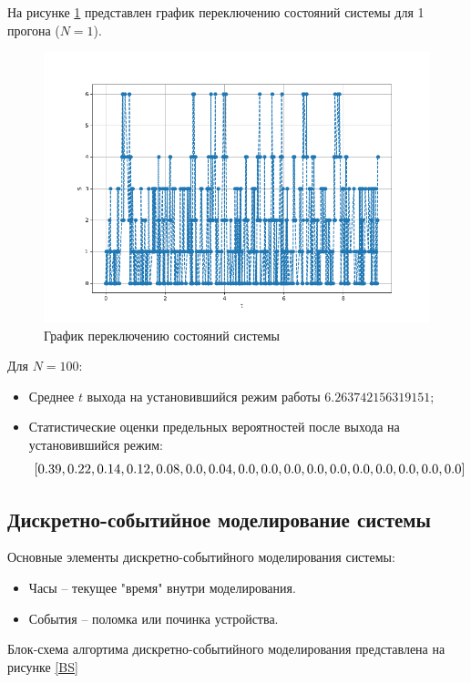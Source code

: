 На рисунке \ref{MDP} представлен график переключению состояний системы для 1 прогона ($N=1$).
\begin{figure}[H]
\centerline{\includegraphics[width=\textwidth]{Images/term.png}}
\caption{График переключению состояний системы}
\label{MDP}
\end{figure}

Для $N=100$:
\begin{itemize}
    \item Среднее $t$ выхода на установившийся режим работы $6.263742156319151$;

    \item Статистические оценки предельных вероятностей после выхода на установившийся режим:
    \[
    \resizebox{\textwidth}{!}{$
[0.39, 0.22, 0.14, 0.12, 0.08, 0.0, 0.04, 0.0, 0.0, 0.0, 0.0, 0.0, 0.0, 0.0, 0.0, 0.0, 0.0]
     $}
\]

\end{itemize}

\subsection{Дискретно-событийное моделирование системы}

Основные элементы дискретно-событийного моделирования системы:
\begin{itemize}
    \item Часы -- текущее "время" внутри моделирования.
    \item События -- поломка или починка устройства.
\end{itemize}
Блок-схема алгортима дискретно-событийного моделирования представлена на рисунке \ref{BS}

